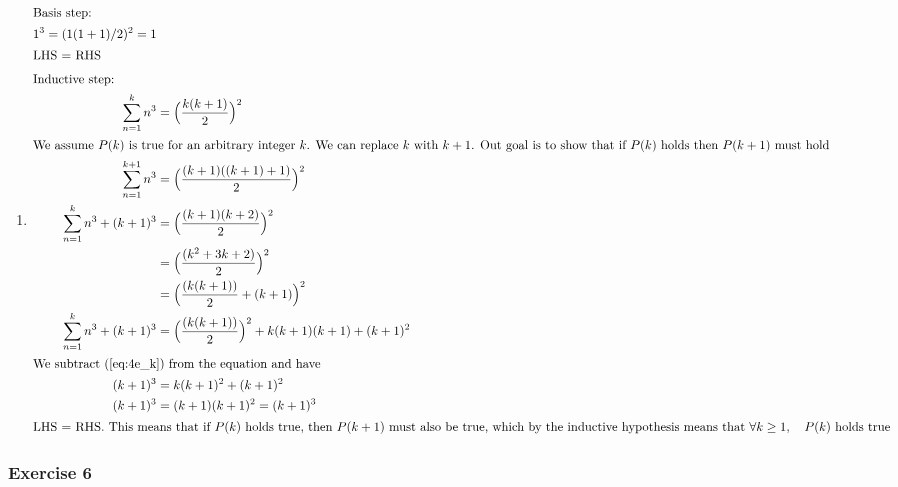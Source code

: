 \documentclass[a4paper]{article}
\newcommand{\ex}[1]{\subsubsection*{#1}}
\begin{document}
\begin{enumerate}[label=\alph*)]
    \item {
            \begin{align}
                \intertext{Basis step:}
                1^3 = (1(1+1)/2)^2 = 1 \\
                \intertext{LHS = RHS}
                \intertext{Inductive step:}
                \sum_{n=1}^k{n^3} &= \Big(\frac{k(k+1)}{2}\Big)^2 \label{eq:4e_k}\\
                \intertext{We assume \(P(k)\) is true for an arbitrary integer
                    \(k\). We can replace \(k\) with \(k+1\). Out goal is to
                    show that if \(P(k)\) holds then \(P(k+1)\) must hold}
                \sum_{n=1}^{k+1}{n^3} &= \Big(\frac{(k+1)((k+1)+1)}{2}\Big)^2 \\
                \sum_{n=1}^{k}{n^3} + (k+1)^3 &= \Big(\frac{(k+1)(k+2)}{2}\Big)^2 \\
                &= \Big(\frac{(k^2+3k+2)}{2}\Big)^2 \\
                &= \Big(\frac{(k(k+1))}{2} + (k+1)\Big)^2 \\
                \sum_{n=1}^{k}{n^3} + (k+1)^3 &= \Big(\frac{(k(k+1))}{2}\Big)^2
                    + k(k+1)(k+1) + (k+1)^2 \\
                \intertext{We subtract (\ref{eq:4e_k}) from the equation and have}
                (k+1)^3 &= k(k+1)^2 + (k+1)^2 \\
                (k+1)^3 &= (k+1)(k+1)^2 = (k+1)^3 \\
                \intertext{LHS = RHS. This means that if \(P(k)\) holds true,
                    then \(P(k+1)\) must also be true, which by the inductive
                    hypothesis means that \(\forall k \geq 1, \quad P(k)\) holds true}
            \end{align}
    }
\end{enumerate}


\ex{Exercise 6}
\end{document}
